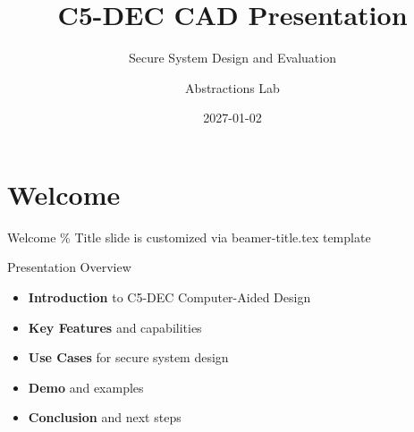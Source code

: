 \documentclass[
  11pt,
  ignorenonframetext,
  aspectratio=169,
]{beamer}
\title{C5-DEC CAD Presentation}
\subtitle{Secure System Design and Evaluation}
\author{Abstractions Lab}
\date{2027-01-02}
\institute{itrust Abstractions Lab}
\providecommand{\tightlist}{%
  \setlength{\itemsep}{0pt}\setlength{\parskip}{0pt}}\usepackage{longtable,booktabs,array}
\begin{document}
\frame{\titlepage}


\section{Welcome}\label{welcome}

\begin{frame}{Welcome}
\% Title slide is customized via beamer-title.tex template
\end{frame}

\begin{frame}{Presentation Overview}
\label{presentation-overview}
\begin{itemize}[<+->]
\tightlist
\item
  \textbf{Introduction} to C5-DEC Computer-Aided Design
\item
  \textbf{Key Features} and capabilities
\item
  \textbf{Use Cases} for secure system design
\item
  \textbf{Demo} and examples
\item
  \textbf{Conclusion} and next steps
\end{itemize}

\end{frame}
\end{document}

